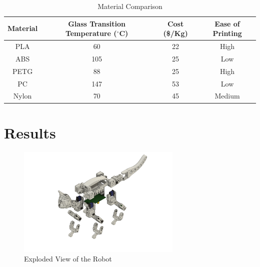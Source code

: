 \documentclass[12pt]{report}
\begin{document}
        \begin{table}[H]
            \centering
            \begin{tabular}{|c|c|c|c|}
            \hline
            Material & Glass Transition Temperature ($^{\circ}$C)& Cost (\$/Kg) & Ease of Printing   \\
            \hline
              PLA   & 60 & 22  & High \\ \hline
              ABS     & 105  &  25 & Low\\ \hline
              PETG     & 88 & 25 & High\\ \hline
              PC     & 147 & 53  & Low\\ \hline
              Nylon   & 70 & 45  & Medium\\
              \hline
            \end{tabular}
            \caption{Material Comparison}
            \label{tab:MaterialsTable}
        \end{table}
\chapter{Results}\label{chap:Results}

\begin{figure}
        \centering
        \includegraphics[width = 0.7\textwidth]{Images/ExplodedView.PNG}
        \caption{Exploded View of the Robot}
        \label{fig:ExplodedView}
    \end{figure}
    
\end{document}
